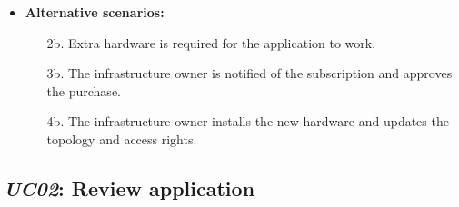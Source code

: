 \begin{itemize}
    \item \textbf{Alternative scenarios:}
    \begin{enumerate}
        \item [2b.] Extra hardware is required for the application to work.
        \item [3b.] The infrastructure owner is notified of the subscription and
                    approves the purchase.
        \item [4b.] The infrastructure owner installs the new hardware and updates
                    the topology and access rights.
    \end{enumerate}
\end{itemize}

\subsection{\emph{UC02}: Review application}
